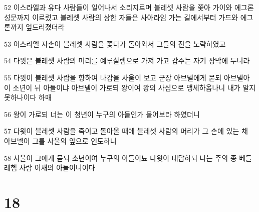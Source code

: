 \par 52 이스라엘과 유다 사람들이 일어나서 소리지르며 블레셋 사람을 쫓아 가이와 에그론 성문까지 이르렀고 블레셋 사람의 상한 자들은 사아라임 가는 길에서부터 가드와 에그론까지 엎드러졌더라
\par 53 이스라엘 자손이 블레셋 사람을 쫓다가 돌아와서 그들의 진을 노략하였고
\par 54 다윗은 블레셋 사람의 머리를 예루살렘으로 가져 가고 갑주는 자기 장막에 두니라
\par 55 다윗이 블레셋 사람을 향하여 나감을 사울이 보고 군장 아브넬에게 묻되 아브넬아 이 소년이 뉘 아들이냐 아브넬이 가로되 왕이여 왕의 사심으로 맹세하옵나니 내가 알지 못하나이다 하매
\par 56 왕이 가로되 너는 이 청년이 누구의 아들인가 물어보라 하였더니
\par 57 다윗이 블레셋 사람을 죽이고 돌아올 때에 블레셋 사람의 머리가 그 손에 있는 채 아브넬이 그를 사울의 앞으로 인도하니
\par 58 사울이 그에게 묻되 소년이여 누구의 아들이뇨 다윗이 대답하되 나는 주의 종 베들레헴 사람 이새의 아들이니이다

\chapter{18}

